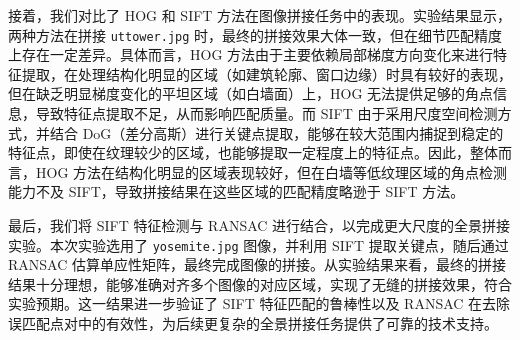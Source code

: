 \documentclass[a4paper, utf8]{ctexart}
\begin{document}
	接着，我们对比了 HOG 和 SIFT 方法在图像拼接任务中的表现。实验结果显示，两种方法在拼接 \verb|uttower.jpg| 时，最终的拼接效果大体一致，但在细节匹配精度上存在一定差异。具体而言，HOG 方法由于主要依赖局部梯度方向变化来进行特征提取，在处理结构化明显的区域（如建筑轮廓、窗口边缘）时具有较好的表现，但在缺乏明显梯度变化的平坦区域（如白墙面）上，HOG 无法提供足够的角点信息，导致特征点提取不足，从而影响匹配质量。而 SIFT 由于采用尺度空间检测方式，并结合 DoG（差分高斯）进行关键点提取，能够在较大范围内捕捉到稳定的特征点，即使在纹理较少的区域，也能够提取一定程度上的特征点。因此，整体而言，HOG 方法在结构化明显的区域表现较好，但在白墙等低纹理区域的角点检测能力不及 SIFT，导致拼接结果在这些区域的匹配精度略逊于 SIFT 方法。

	最后，我们将 SIFT 特征检测与 RANSAC 进行结合，以完成更大尺度的全景拼接实验。本次实验选用了 \verb|yosemite.jpg| 图像，并利用 SIFT 提取关键点，随后通过 RANSAC 估算单应性矩阵，最终完成图像的拼接。从实验结果来看，最终的拼接结果十分理想，能够准确对齐多个图像的对应区域，实现了无缝的拼接效果，符合实验预期。这一结果进一步验证了 SIFT 特征匹配的鲁棒性以及 RANSAC 在去除误匹配点对中的有效性，为后续更复杂的全景拼接任务提供了可靠的技术支持。
	
\end{document}
